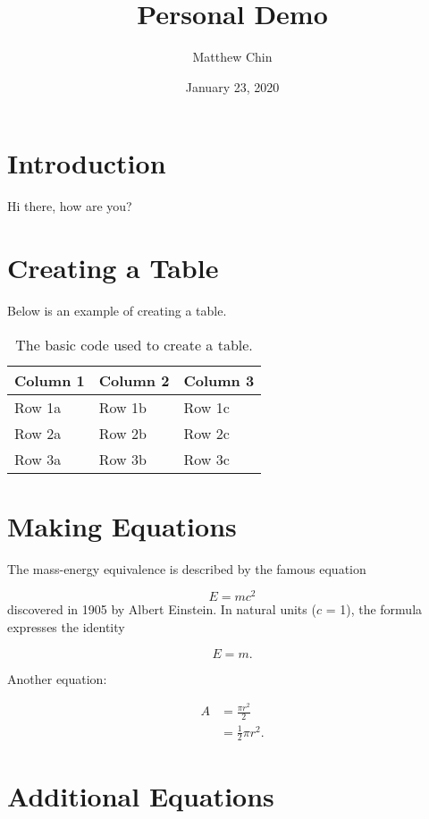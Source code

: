 \documentclass{article}
\title{Personal Demo}
\author{Matthew Chin}
\date{January 23, 2020}
\begin{document}
\maketitle

\section{Introduction}

Hi there, how are you?

\section{Creating a Table}

Below is an example of creating a table.

\begin{table}[h]
\centering
    \begin{tabular}{|l|l|l|}
    \hline
    Column 1 & Column 2 & Column 3\\
    \hline
    Row 1a & Row 1b & Row 1c\\
    Row 2a & Row 2b & Row 2c\\
    Row 3a & Row 3b & Row 3c\\
    \hline
    \end{tabular}
    \caption{The basic code used to create a table.}
\end{table}

\section{Making Equations}

\noindent
The mass-energy equivalence is described by the famous equation 

\[E=mc^2\]
\noindent
discovered in 1905 by Albert Einstein.
In natural units ($c$ = 1), the formula expresses the identity

\begin{equation}
    E=m.
\end{equation}{}

\noindent
Another equation:

\begin{equation} \label{eq1}
\begin{split}
A &= \frac{\pi r^2}{2} \\
 &= \frac{1}{2} \pi r^2.
\end{split}
\end{equation}

\section{Additional Equations}
\end{document}
